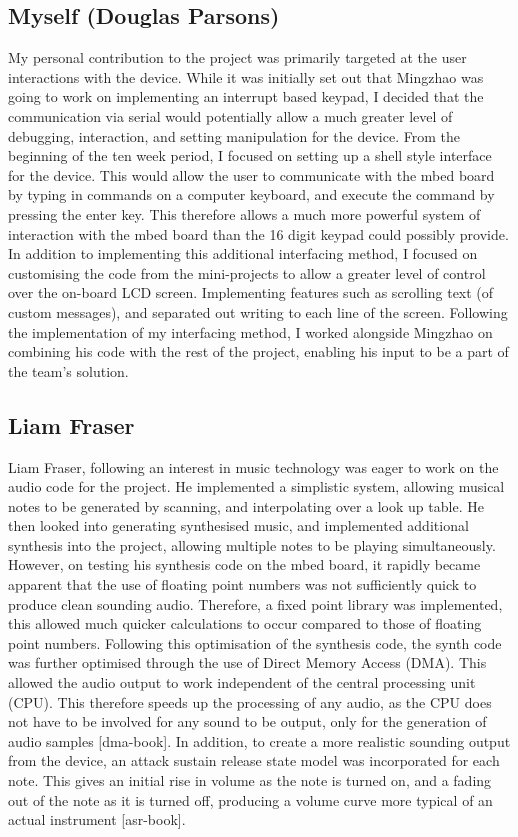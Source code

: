 \subsection*{Myself (Douglas Parsons)}

My personal contribution to the project was primarily targeted at the user 
interactions with the device. While it was initially set out that Mingzhao was 
going to work on implementing an interrupt based keypad, I decided that the 
communication via serial would potentially allow a much greater level of 
debugging, interaction, and setting manipulation for the device. From the 
beginning of the ten week period, I focused on setting up a shell style interface 
for the device. This would allow the user to communicate with the mbed board by 
typing in commands on a computer keyboard, and execute the command by pressing 
the enter key. This therefore allows a much more powerful system of interaction 
with the mbed board than the 16 digit keypad could possibly provide. In addition 
to implementing this additional interfacing method, I focused on customising the 
code from the mini-projects to allow a greater level of control over the on-board 
LCD screen. Implementing features such as scrolling text (of custom messages), 
and separated out writing to each line of the screen. Following the implementation 
of my interfacing method, I worked alongside Mingzhao on combining his code with 
the rest of the project, enabling his input to be a part of the team's solution.

\subsection*{Liam Fraser}
Liam Fraser, following an interest in music technology was eager to work on the 
audio code for the project. He implemented a simplistic system, allowing musical 
notes to be generated by scanning, and interpolating over a look up table. He then 
looked into generating synthesised music, and implemented additional synthesis 
into the project, allowing multiple notes to be playing simultaneously. However, 
on testing his synthesis code on the mbed board, it rapidly became apparent that 
the use of floating point numbers was not sufficiently quick to produce clean 
sounding audio. Therefore, a fixed point library was implemented, this allowed 
much quicker calculations to occur compared to those of floating point numbers. 
Following this optimisation of the synthesis code, the synth code was further 
optimised through the use of Direct Memory Access (DMA). This allowed the audio 
output to work independent of the central processing unit (CPU). This 
therefore speeds up the processing of any audio, as the CPU does not have to be 
involved for any sound to be output, only for the generation of audio samples 
[dma-book]. In addition, to create a more realistic sounding output from the 
device, an attack sustain release state model was incorporated for each note. 
This gives an initial rise in volume as the note is turned on, and a fading out 
of the note as it is turned off, producing a volume curve more typical of an 
actual instrument [asr-book].

